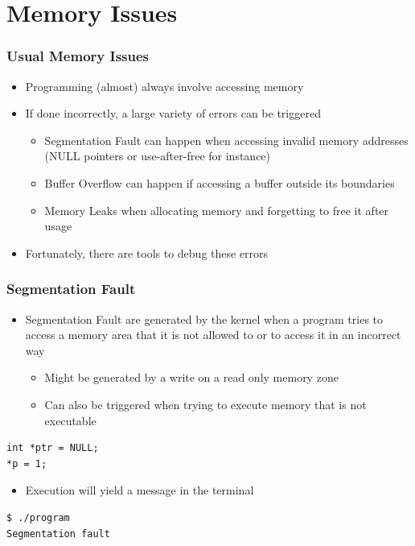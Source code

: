 \section{Memory Issues}

\begin{frame}
  \frametitle{Usual Memory Issues}
  \begin{itemize}
    \item Programming (almost) always involve accessing memory
    \item If done incorrectly, a large variety of errors can be triggered
    \begin{itemize}
      \item Segmentation Fault can happen when accessing invalid memory
            addresses (NULL pointers or use-after-free for instance)
      \item Buffer Overflow can happen if accessing a buffer outside its
            boundaries
      \item Memory Leaks when allocating memory and forgetting to free it after
            usage
    \end{itemize}
    \item Fortunately, there are tools to debug these errors
  \end{itemize}
\end{frame}

\begin{frame}[fragile]
  \frametitle{Segmentation Fault}
  \begin{itemize}
    \item Segmentation Fault are generated by the kernel when a program tries to
          access a memory area that it is not allowed to or to access it in an
          incorrect way
    \begin{itemize}
      \item Might be generated by a write on a read only memory zone
      \item Can also be triggered when trying to execute memory that is not
            executable
    \end{itemize}
  \end{itemize}

  \begin{block}{}
    \begin{verbatim}
int *ptr = NULL;
*p = 1;
    \end{verbatim}
  \end{block}

  \begin{itemize}
    \item Execution will yield a  message in the
          terminal
  \end{itemize}
  \vspace{0.2cm}

  \begin{block}{}
    \begin{verbatim}
$ ./program
Segmentation fault
    \end{verbatim}
  \end{block}
\end{frame}

